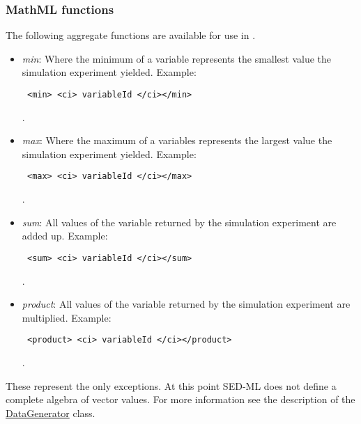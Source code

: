 \subsubsection{MathML functions}
The following aggregate functions are available for use in \LoneVone.

\begin{itemize}\setlength{\parskip}{-0.1ex}

\item \emph{min}: Where the minimum of a variable represents the smallest value 
the simulation experiment yielded. Example: 

\begin{verbatim} <min> <ci> variableId </ci></min> \end{verbatim}.

\item \emph{max}: Where the maximum of a variables represents the largest value 
the simulation experiment yielded. Example: 

\begin{verbatim} <max> <ci> variableId </ci></max> \end{verbatim}.

\item \emph{sum}: All values of the variable returned by the simulation 
experiment are added up. Example: 

\begin{verbatim} <sum> <ci> variableId </ci></sum> \end{verbatim}.

\item \emph{product}: All values of the variable returned by the simulation 
experiment are multiplied. Example: 

\begin{verbatim} <product> <ci> variableId </ci></product> \end{verbatim}.

\end{itemize}

These represent the only exceptions. At this point SED-ML does not define a complete algebra of vector values. For more information see the description of the \hyperref[class:dataGenerator]{DataGenerator} class.

